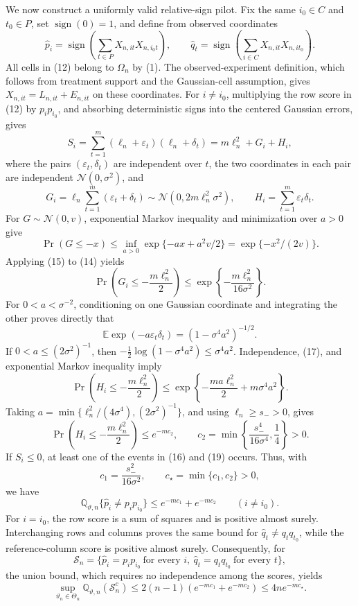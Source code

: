 We now construct a uniformly valid relative-sign pilot.  Fix the same \(i_0\in C\) and \(t_0\in P\), set \(\operatorname{sign}(0)=1\), and define from observed coordinates
\[
\widehat p_i=\operatorname{sign}\!\left(\sum_{t\in P}X_{n,it}X_{n,i_0t}\right),
\qquad
\widehat q_t=\operatorname{sign}\!\left(\sum_{i\in C}X_{n,it}X_{n,it_0}\right).    \tag{12}
\]
All cells in (12) belong to \(\Omega_n\) by (1).  The observed-experiment definition, which follows from treatment support and the Gaussian-cell assumption, gives \(X_{n,it}=L_{n,it}+E_{n,it}\) on these coordinates.  For \(i\ne i_0\), multiplying the row score in (12) by \(p_ip_{i_0}\), and absorbing deterministic signs into the centered Gaussian errors, gives
\[
S_i=\sum_{t=1}^{m}(\ell_n+\varepsilon_t)(\ell_n+\delta_t)
=m\ell_n^2+G_i+H_i,                                    \tag{13}
\]
where the pairs \((\varepsilon_t,\delta_t)\) are independent over \(t\), the two coordinates in each pair are independent \(\mathcal N(0,\sigma^2)\), and
\[
G_i=\ell_n\sum_{t=1}^{m}(\varepsilon_t+\delta_t)
\sim\mathcal N(0,2m\ell_n^2\sigma^2),
\qquad H_i=\sum_{t=1}^{m}\varepsilon_t\delta_t.         \tag{14}
\]
For \(G\sim\mathcal N(0,v)\), exponential Markov inequality and minimization over \(a>0\) give
\[
\Pr(G\le-x)\le\inf_{a>0}\exp\{-ax+a^2v/2\}
=\exp\{-x^2/(2v)\}.                                   \tag{15}
\]
Applying (15) to (14) yields
\[
\Pr\!\left(G_i\le-\frac{m\ell_n^2}{2}\right)
\le\exp\!\left\{-\frac{m\ell_n^2}{16\sigma^2}\right\}.       \tag{16}
\]
For \(0<a<\sigma^{-2}\), conditioning on one Gaussian coordinate and integrating the other proves directly that
\[
\mathbb E\exp(-a\varepsilon_t\delta_t)
=(1-\sigma^4a^2)^{-1/2}.                                \tag{17}
\]
If \(0<a\le(2\sigma^2)^{-1}\), then \(-\tfrac12\log(1-\sigma^4a^2)\le\sigma^4a^2\).  Independence, (17), and exponential Markov inequality imply
\[
\Pr\!\left(H_i\le-\frac{m\ell_n^2}{2}\right)
\le\exp\!\left\{-\frac{ma\ell_n^2}{2}+m\sigma^4a^2\right\}.  \tag{18}
\]
Taking \(a=\min\{\ell_n^2/(4\sigma^4),(2\sigma^2)^{-1}\}\), and using \(\ell_n\ge s_->0\), gives
\[
\Pr\!\left(H_i\le-\frac{m\ell_n^2}{2}\right)\le e^{-mc_2},
\qquad
c_2=\min\!\left\{\frac{s_-^4}{16\sigma^4},\frac14\right\}>0. \tag{19}
\]
If \(S_i\le0\), at least one of the events in (16) and (19) occurs.  Thus, with
\[
c_1=\frac{s_-^2}{16\sigma^2},\qquad c_\star=\min\{c_1,c_2\}>0,
\]
we have
\[
\mathbb Q_{\vartheta,n}\{\widehat p_i\ne p_ip_{i_0}\}
\le e^{-mc_1}+e^{-mc_2}\qquad(i\ne i_0).               \tag{20}
\]
For \(i=i_0\), the row score is a sum of squares and is positive almost surely.  Interchanging rows and columns proves the same bound for \(\widehat q_t\ne q_tq_{t_0}\), while the reference-column score is positive almost surely.  Consequently, for
\[
\mathcal S_n=
\{\widehat p_i=p_ip_{i_0}\ \text{for every }i,
\ \widehat q_t=q_tq_{t_0}\ \text{for every }t\},
\]
the union bound, which requires no independence among the scores, yields
\[
\sup_{\vartheta_n\in\Theta_n}
\mathbb Q_{\vartheta,n}(\mathcal S_n^c)
\le2(n-1)(e^{-mc_1}+e^{-mc_2})
\le4ne^{-mc_\star}.                                    \tag{21}
\]

